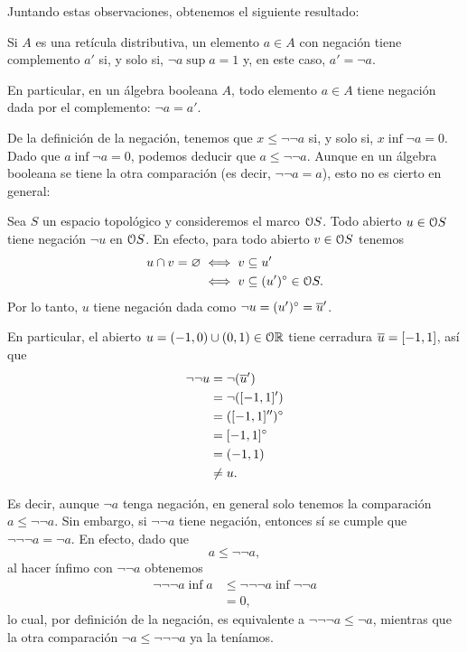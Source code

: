 Juntando estas observaciones, obtenemos el siguiente resultado:
\begin{lemma}
  \label{lemma:complementado-ssi-supneg}
   Si $A$ es una retícula distributiva,
   un elemento $a\in A$ con negación tiene complemento $a'$
   si, y solo si, $\neg a\sup a=1$ y, en este caso, $a'=\neg a$.
\end{lemma}

En particular, en un álgebra booleana $A$, todo elemento $a\in A$
tiene negación dada por el complemento: $\neg a = a'$.

De la definición de la negación, tenemos que
$x\leq \neg\neg a$ si, y solo si, $x\inf\neg a=0$.
Dado que $a\inf\neg a=0$, podemos deducir que $a\leq\neg\neg a$.
Aunque en un álgebra booleana se tiene la otra comparación
(es decir, $\neg\neg a = a$),
esto no es cierto en general:

\begin{example}
  \label{exa:negaciones-en-espacios-top}
  Sea $S$ un espacio topológico y consideremos el marco $\cal OS$.
  Todo abierto $u\in\cal O S$ tiene negación $\neg u$ en $\cal OS$.
  En efecto, para todo abierto $v\in\cal OS$ tenemos
  \begin{align*}
        u\cap v = \emptyset
        &\iff v\subseteq u' \\
        &\iff v\subseteq (u')^\circ \in\cal OS.
  \end{align*}
  Por lo tanto, $u$ tiene negación dada como
  $\neg u = (u')^\circ = {\ol u}'$.
  
  En particular, el abierto $u=(-1,0)\cup(0,1)\in\cal O\mathbb R$
  tiene cerradura $\ol u = [-1,1]$, así que
  \begin{align*}
    \neg\neg u
    &= \neg(\ol u ') \\
    &= \neg([-1,1]') \\
    &= ([-1,1]'')^\circ \\
    &= [-1,1]^\circ \\
    &= (-1,1) \\
    &\neq u.
  \end{align*}
\end{example}

Es decir, aunque $\neg a$ tenga negación, en general
solo tenemos la comparación $a\leq\neg\neg a$.
Sin embargo, si $\neg\neg a$ tiene negación, entonces sí se
cumple que $\neg\neg\neg a=\neg a$.
En efecto, dado que
\[
  a \leq \neg\neg a
,\]
al hacer ínfimo con $\neg\neg a$ obtenemos
\begin{align*}
  \neg\neg\neg a\inf a
  &\leq \neg\neg\neg a\inf \neg\neg a  \\
  &= 0,
\end{align*}
lo cual, por definición de la negación, es equivalente a
$\neg\neg\neg a\leq\neg a$, mientras que la otra comparación
$\neg a\leq\neg\neg\neg a$ ya la teníamos.

